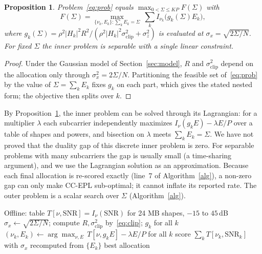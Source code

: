 \documentclass[conference]{IEEEtran}
\newtheorem{proposition}{Proposition}
\begin{document}
\begin{proposition}\label{prop:dec}
Problem~\eqref{eq:prob} equals $\max_{0<\Sigma\le KP} F(\Sigma)$ with
\begin{equation}
F(\Sigma)=\max_{\{\nu_k,E_k\}:\sum_k E_k=\Sigma}\ \sum_k I_{\nu_k}\!\big(g_k(\Sigma)E_k\big),
\end{equation}
where $g_k(\Sigma)=\rho^2|H_k|^2R^2/(\rho^2|H_k|^2\sigma^2_{\mathrm{clip}}+\sigma_z^2)$ is evaluated at $\sigma_x=\sqrt{2\Sigma/N}$. For fixed $\Sigma$ the inner problem is separable with a single linear constraint.
\end{proposition}
\begin{proof}
Under the Gaussian model of Section~\ref{sec:model}, $R$ and $\sigma^2_{\mathrm{clip}}$ depend on the allocation only through $\sigma_x^2=2\Sigma/N$. Partitioning the feasible set of~\eqref{eq:prob} by the value of $\Sigma=\sum_kE_k$ fixes $g_k$ on each part, which gives the stated nested form; the objective then splits over $k$.
\end{proof}

By Proposition~\ref{prop:dec}, the inner problem can be solved through its Lagrangian: for a multiplier $\lambda$ each subcarrier independently maximizes $I_{\nu}(g_kE)-\lambda E/P$ over a table of shapes and powers, and bisection on $\lambda$ meets $\sum_kE_k=\Sigma$. We have not proved that the duality gap of this discrete inner problem is zero. For separable problems with many subcarriers the gap is usually small (a time-sharing argument), and we use the Lagrangian solution as an approximation. Because each final allocation is re-scored exactly (line~7 of Algorithm~\ref{alg}), a non-zero gap can only make CC-EPL sub-optimal; it cannot inflate its reported rate. The outer problem is a scalar search over $\Sigma$ (Algorithm~\ref{alg}).

\begin{algorithm}[t]\caption{CC-EPL}\label{alg}\small
\begin{algorithmic}[1]
\State Offline: table $T[\nu,\mathrm{SNR}]=I_\nu(\mathrm{SNR})$ for 24 MB shapes, $-15$ to $45$\,dB
\For{$\Sigma$ on a log grid in $(0,KP]$}
\State $\sigma_x\gets\sqrt{2\Sigma/N}$; compute $R,\sigma^2_{\mathrm{clip}}$ by~\eqref{eq:clip}; $g_k$ for all $k$
\Repeat {}
\State $(\nu_k,E_k)\gets\arg\max_{\nu,E}\,T[\nu,g_kE]-\lambda E/P$ for all $k$
\State score $\sum_k T[\nu_k,\mathrm{SNR}_k]$ with $\sigma_x$ recomputed from $\{E_k\}$
\EndFor
\State \Return best allocation
\end{algorithmic}\end{algorithm}
\end{document}
